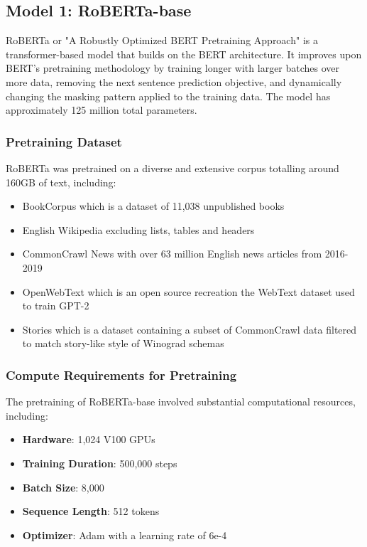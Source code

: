 \documentclass[titlepage]{article}
\begin{document}
\subsection{Model 1: RoBERTa-base}
RoBERTa or "A Robustly Optimized BERT Pretraining Approach" is a transformer-based model that builds on the BERT architecture. It improves upon 
BERT's pretraining methodology by training longer with larger batches over more data, removing the next sentence prediction objective, and dynamically 
changing the masking pattern applied to the training data. The model has approximately 125 million total parameters. 

\subsubsection{Pretraining Dataset}
RoBERTa was pretrained on a diverse and extensive corpus totalling around 160GB of text, including:
\begin{itemize}
    \item BookCorpus which is a dataset of 11,038 unpublished books 
    \item English Wikipedia excluding lists, tables and headers 
    \item CommonCrawl News with over 63 million English news articles from 2016-2019 
    \item OpenWebText which is an open source recreation the WebText dataset used to train GPT-2 
    \item Stories which is a dataset containing a subset of CommonCrawl data filtered to match story-like style of Winograd schemas
\end{itemize}

\subsubsection{Compute Requirements for Pretraining}
The pretraining of RoBERTa-base involved substantial computational resources, including:
\begin{itemize}
    \item \textbf{Hardware}: 1,024 V100 GPUs
    \item \textbf{Training Duration}: 500,000 steps 
    \item \textbf{Batch Size}: 8,000
    \item \textbf{Sequence Length}: 512 tokens
    \item \textbf{Optimizer}: Adam with a learning rate of 6e-4 
\end{itemize}
\end{document}
